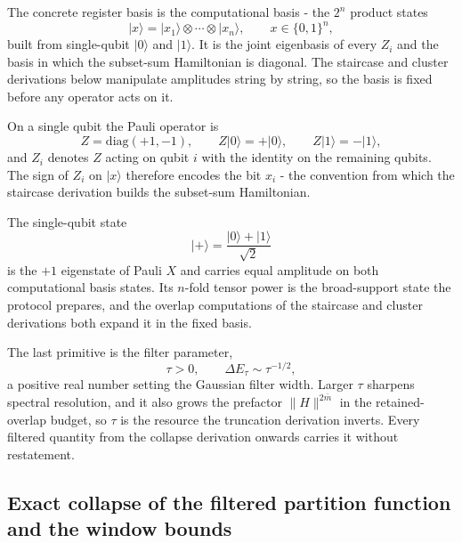 The concrete register basis is the computational basis - the $2^n$ product states
\begin{equation}\label{def:computational-basis}
|x\rangle = |x_1\rangle \otimes \cdots \otimes |x_n\rangle , \qquad x \in \{0,1\}^n ,
\end{equation}
built from single-qubit $|0\rangle$ and $|1\rangle$. It is the joint eigenbasis of every $Z_i$ and the basis in which the subset-sum Hamiltonian is diagonal. The staircase and cluster derivations below manipulate amplitudes string by string, so the basis is fixed before any operator acts on it.

On a single qubit the Pauli operator is
\begin{equation}\label{def:pauli-z}
Z = \mathrm{diag}(+1, -1) , \qquad Z|0\rangle = +|0\rangle , \qquad Z|1\rangle = -|1\rangle ,
\end{equation}
and $Z_i$ denotes $Z$ acting on qubit $i$ with the identity on the remaining qubits. The sign of $Z_i$ on $|x\rangle$ therefore encodes the bit $x_i$ - the convention from which the staircase derivation builds the subset-sum Hamiltonian.

The single-qubit state
\begin{equation}\label{def:plus-state}
|+\rangle = \frac{|0\rangle + |1\rangle}{\sqrt{2}}
\end{equation}
is the $+1$ eigenstate of Pauli $X$ and carries equal amplitude on both computational basis states. Its $n$-fold tensor power is the broad-support state the protocol prepares, and the overlap computations of the staircase and cluster derivations both expand it in the fixed basis.

The last primitive is the filter parameter,
\begin{equation}\label{def:imaginary-time-parameter}
\tau > 0 , \qquad \Delta E_\tau \sim \tau^{-1/2} ,
\end{equation}
a positive real number setting the Gaussian filter width. Larger $\tau$ sharpens spectral resolution, and it also grows the prefactor $\|H\|^{2\bar m}$ in the retained-overlap budget, so $\tau$ is the resource the truncation derivation inverts. Every filtered quantity from the collapse derivation onwards carries it without restatement.

\subsection*{Exact collapse of the filtered partition function and the window bounds}

